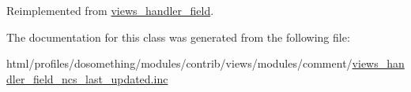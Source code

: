 Reimplemented from \hyperlink{classviews__handler__field_a4f661f91bcbe80d4a00c30a31456c502}{views\_\-handler\_\-field}.

The documentation for this class was generated from the following file:\begin{DoxyCompactItemize}
\item 
html/profiles/dosomething/modules/contrib/views/modules/comment/\hyperlink{views__handler__field__ncs__last__updated_8inc}{views\_\-handler\_\-field\_\-ncs\_\-last\_\-updated.inc}\end{DoxyCompactItemize}
